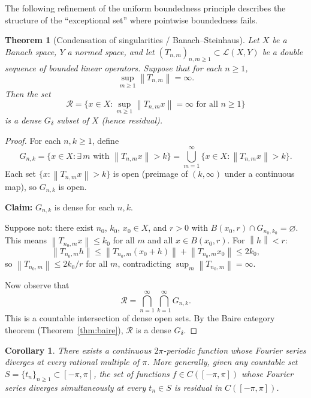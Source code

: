 \documentclass[a4paper,12pt]{book}
\newcommand{\norm}[1]{\left\| #1 \right\|}
\theoremstyle{definition}
\theoremstyle{plain}
\newtheorem{theorem}[definition]{Theorem}
\newtheorem{corollary}[definition]{Corollary}
\theoremstyle{remark}
\begin{document}
The following refinement of the uniform boundedness principle describes the structure
of the ``exceptional set'' where pointwise boundedness fails.

\begin{theorem}[Condensation of singularities / Banach--Steinhaus]%
\label{thm:condensation}
Let $X$ be a Banach space, $Y$ a normed space, and let
$(T_{n,m})_{n,m \geq 1} \subset \mathcal{L}(X,Y)$ be a double sequence of bounded
linear operators. Suppose that for each $n \geq 1$,
\[
  \sup_{m \geq 1} \norm{T_{n,m}} = \infty.
\]
Then the set
\[
  \mathcal{R} = \bigl\{ x \in X : \sup_{m \geq 1} \norm{T_{n,m} x} = \infty
  \text{ for all } n \geq 1 \bigr\}
\]
is a dense $G_\delta$ subset of $X$ (hence residual).
\end{theorem}

\begin{proof}
For each $n, k \geq 1$, define
\[
  G_{n,k} = \bigl\{ x \in X : \exists\, m \text{ with }
  \norm{T_{n,m} x} > k \bigr\}
  = \bigcup_{m=1}^{\infty} \bigl\{ x \in X : \norm{T_{n,m} x} > k \bigr\}.
\]
Each set $\{x : \norm{T_{n,m}x} > k\}$ is open (preimage of $(k,\infty)$ under
a continuous map), so $G_{n,k}$ is open.

\textbf{Claim:} $G_{n,k}$ is dense for each $n, k$.

Suppose not: there exist $n_0$, $k_0$, $x_0 \in X$, and $r > 0$ with
$B(x_0, r) \cap G_{n_0,k_0} = \varnothing$. This means $\norm{T_{n_0,m}x} \leq k_0$
for all $m$ and all $x \in B(x_0, r)$. For $\norm{h} < r$:
\[
  \norm{T_{n_0,m} h} \leq \norm{T_{n_0,m}(x_0 + h)} + \norm{T_{n_0,m} x_0}
  \leq 2 k_0,
\]
so $\norm{T_{n_0,m}} \leq 2k_0/r$ for all $m$, contradicting
$\sup_m \norm{T_{n_0,m}} = \infty$.

Now observe that
\[
  \mathcal{R} = \bigcap_{n=1}^{\infty} \bigcap_{k=1}^{\infty} G_{n,k}.
\]
This is a countable intersection of dense open sets. By the Baire category theorem
(Theorem~\ref{thm:baire}), $\mathcal{R}$ is a dense $G_\delta$.
\end{proof}

\begin{corollary}\label{cor:condensation-fourier}
There exists a continuous $2\pi$-periodic function whose Fourier series diverges at
every rational multiple of $\pi$. More generally, given any countable set
$S = \{t_n\}_{n \geq 1} \subset [-\pi, \pi]$, the set of functions
$f \in C([-\pi,\pi])$ whose Fourier series diverges simultaneously at every
$t_n \in S$ is residual in $C([-\pi,\pi])$.
\end{corollary}
\end{document}

